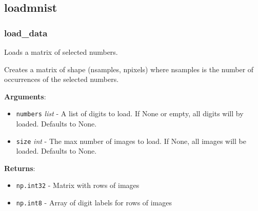\subsection{loadmnist}

\subsubsection{load\_data}

\begin{Shaded}
\begin{Highlighting}[]
\OperatorTok{=}\OperatorTok{=}\NormalTok{)}
\end{Highlighting}
\end{Shaded}

Loads a matrix of selected numbers.

Creates a matrix of shape (nsamples, npixels) where nsamples is the
number of occurrences of the selected numbers.

\textbf{Arguments}:

\begin{itemize}
\tightlist
\item
  \texttt{numbers} \emph{list} - A list of digits to load. If None or
  empty, all digits will by loaded. Defaults to None.
\item
  \texttt{size} \emph{int} - The max number of images to load. If None,
  all images will be loaded. Defaults to None.
\end{itemize}

\textbf{Returns}:

\begin{itemize}
\tightlist
\item
  \texttt{np.int32} - Matrix with rows of images
\item
  \texttt{np.int8} - Array of digit labels for rows of images
\end{itemize}
